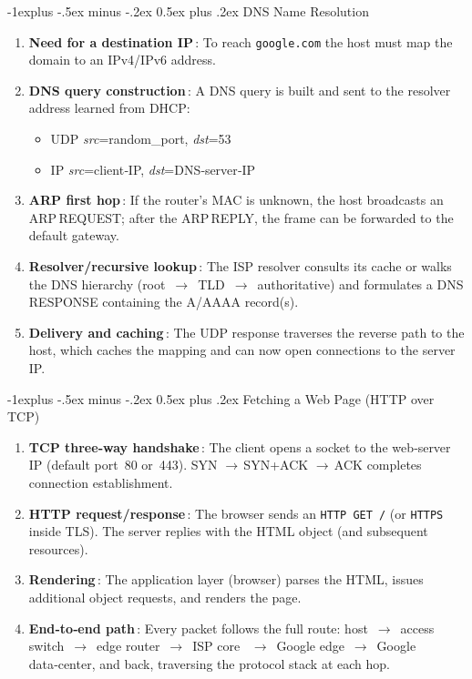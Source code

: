 \documentclass[letterpaper, 8pt]{extarticle}
\makeatletter
\renewcommand{\subsection}{\@startsection{subsection}{2}{0mm}%
                                {-1explus -.5ex minus -.2ex}%
                                {0.5ex plus .2ex}%
                                {\normalfont\small\bfseries}}
\makeatother
\begin{document}
\begin{multicols*}{4}
	\subsection{DNS Name Resolution}
	\begin{enumerate}
		\item \textbf{Need for a destination IP}\,:
		      To reach \texttt{google.com} the host must map the domain to an IPv4/IPv6 address.
		\item \textbf{DNS query construction}\,:
		      A DNS query is built and sent to the resolver address learned from DHCP:
		      \begin{itemize}
			      \item UDP \emph{src}=random\_port, \emph{dst}=53
			      \item IP \emph{src}=client‑IP, \emph{dst}=DNS‑server‑IP
		      \end{itemize}
		\item \textbf{ARP first hop}\,:
		      If the router’s MAC is unknown, the host broadcasts an ARP\,REQUEST; after the ARP\,REPLY,
		      the frame can be forwarded to the default gateway.
		\item \textbf{Resolver/recursive lookup}\,:
		      The ISP resolver consults its cache or walks the DNS hierarchy (root~$\to$~TLD~$\to$~authoritative)
		      and formulates a DNS\,RESPONSE containing the A/AAAA record(s).
		\item \textbf{Delivery and caching}\,:
		      The UDP response traverses the reverse path to the host, which caches the mapping and can now open
		      connections to the server IP.
	\end{enumerate}

	\subsection{Fetching a Web Page (HTTP over TCP)}
	\begin{enumerate}
		\item \textbf{TCP three‑way handshake}\,:
		      The client opens a socket to the web‑server IP (default port~80 or~443).
		      SYN $\rightarrow$\,SYN+ACK $\rightarrow$\,ACK completes connection establishment.
		\item \textbf{HTTP request/response}\,:
		      The browser sends an \texttt{HTTP GET /} (or \texttt{HTTPS} inside TLS).
		      The server replies with the HTML object (and subsequent resources).
		\item \textbf{Rendering}\,:
		      The application layer (browser) parses the HTML, issues additional object requests, and renders the page.
		\item \textbf{End‑to‑end path}\,:
		      Every packet follows the full route: host~$\to$~access switch~$\to$~edge router~$\to$~ISP core~
		      $\to$~Google edge~$\to$~Google data‑center, and back, traversing the protocol stack at each hop.
	\end{enumerate}



\end{multicols*}
\end{document}
